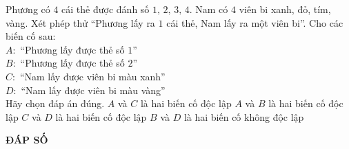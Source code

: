 \begin{ex}%
	Phương có $4$ cái thẻ được đánh số $1,\, 2,\,3,\,4$.  Nam có $4$ viên bi xanh, đỏ, tím, vàng. Xét phép thử ``Phương lấy ra $1$ cái thẻ, Nam lấy ra một viên bi''. Cho các biến cố sau:\\
	$A:$ ``Phương lấy được thẻ số $1$''\\
	$B:$ ``Phương lấy được thẻ số $2$''\\
	$C:$ ``Nam lấy được viên bi màu xanh''\\
	$D:$ ``Nam lấy được viên bi màu vàng''\\
	Hãy chọn đáp án đúng.
	\choice
	{\True $A$ và $C$ là hai biến cố độc lập}
	{$A$ và $B$ là hai biến cố độc lập}
	{$C$ và $D$ là hai biến cố độc lập}
	{$B$ và $D$ là hai biến cố không độc lập}
\end{ex}

\newpage 
\begin{center}
	\textbf{ĐÁP SỐ}
\end{center}
\begin{multicols}{10}
	\setlength{\columnseprule}{0pt}
	 
\end{multicols}
